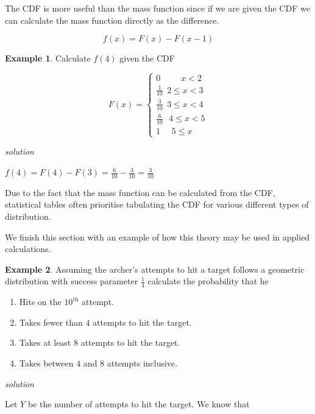 \documentclass[
]{book}
\theoremstyle{definition}
\theoremstyle{definition}
\newtheorem{example}{Example}[chapter]
\theoremstyle{definition}
\theoremstyle{definition}
\theoremstyle{remark}
\begin{document}
The CDF is more useful than the mass function since if we are given the CDF we can calculate the mass function directly as the difference.

\[f(x) = F(x)-F(x-1)\]

\begin{example}
Calculate \(f(4)\) given the CDF

\begin{equation*}
  F(x)=\begin{cases}
  0  \ \ \ \ \ \ \ \ \ \ \   x<2 \\
  \frac{1}{10} \  \  2\leq x < 3 \\
  \frac{3}{10} \ \  3\leq x < 4 \\
  \frac{6}{10} \ \ \ 4\leq x < 5 \\
  1 \ \ \  \ \ \  5\leq x
  \end{cases}
\end{equation*}

\emph{solution}

\(f(4) = F(4)-F(3) = \frac{6}{10}-\frac{3}{10} = \frac{3}{10}\)
\end{example}

Due to the fact that the mass function can be calculated from the CDF, statistical tables often prioritise tabulating the CDF for various different types of distribution.

We finish this section with an example of how this theory may be used in applied calculations.

\begin{example}

Assuming the archer's attempts to hit a target follows a geometric distribution with success parameter \(\frac{1}{4}\) calculate the probability that he

\begin{enumerate}
\def\labelenumi{\arabic{enumi}.}
\item
  Hits on the \(10^{\text{th}}\) attempt.
\item
  Takes fewer than \(4\) attempts to hit the target.
\item
  Takes at least \(8\) attempts to hit the target.
\item
  Takes between \(4\) and \(8\) attempts inclusive.
\end{enumerate}

\end{example}

\emph{solution}

Let \(Y\) be the number of attempts to hit the target. We know that
\end{document}
